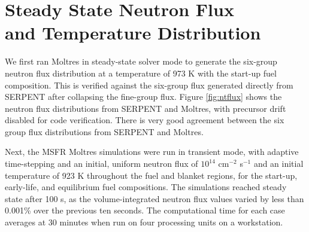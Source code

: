 \documentclass{anstrans}
\begin{document}
\section{Steady State Neutron Flux \\and Temperature Distribution}

	We first ran Moltres in steady-state solver mode to generate the six-group
	neutron flux distribution at a temperature of 973 K with the start-up fuel
	composition. This
	is verified against the six-group flux generated directly from SERPENT
	after collapsing the fine-group flux.
	Figure \ref{fig:ntflux} shows the neutron flux
	distributions from SERPENT and Moltres, with precursor drift disabled for
	code verification. There is very good agreement between the six group
	flux distributions from SERPENT and Moltres.
	
	Next, the \gls{MSFR} Moltres simulations were
	run in transient mode, with adaptive time-stepping and an
	initial, uniform neutron flux of $10^{14}$
	cm$^{-2}$ s$^{-1}$ and an initial temperature of 923 K throughout the
	fuel and blanket regions, for the start-up, early-life, and equilibrium
	fuel compositions. The simulations reached steady state after 100 s, as the
	volume-integrated neutron flux values varied by less than 0.001\% over the
	previous ten seconds. The computational time for each case averages at 30
	minutes when run on four processing units on a workstation.
\end{document}
